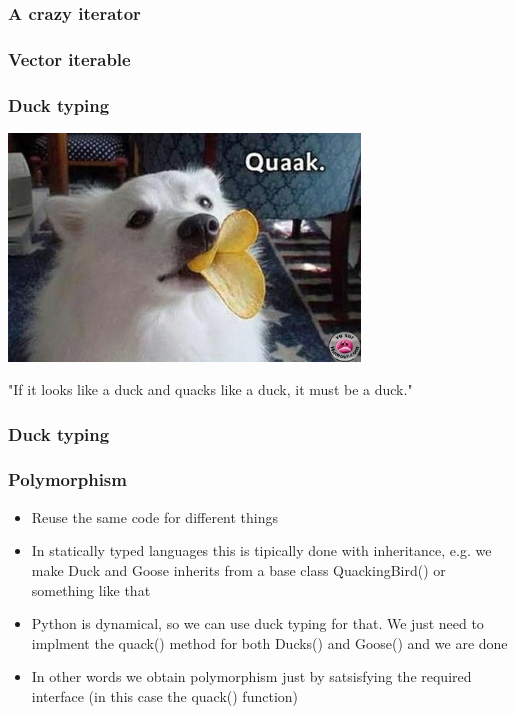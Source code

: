 \documentclass[9pt]{beamer}
\begin{document}
\begin{frame}
  \frametitle{A crazy iterator}
  
\end{frame}


\begin{frame}
  \frametitle{Vector iterable}
  
\end{frame}


\begin{frame}
  \frametitle{Duck typing}
  
  \centering
  \includegraphics[width=0.7\textwidth]{quack.png}  
  
  \bigskip
  
  \centering
  "If it looks like a duck and quacks like a duck, it must be a duck."
  
\end{frame}


\begin{frame}
  \frametitle{Duck typing}
  
\end{frame}


\begin{frame}
  \frametitle{Polymorphism}
  
  \begin{itemize}
    \item Reuse the same code for different things
    \medskip
    \item In statically typed languages this is tipically done with inheritance,
          e.g. we make Duck and Goose inherits from a base class QuackingBird()
          or something like that
    \medskip
    \item Python is dynamical, so we can use duck typing for that.
          We just need to implment the quack() method for both Ducks() and Goose() 
          and we are done
    \medskip
    \item In other words we obtain polymorphism just by satsisfying the required \alert{interface}
          (in this case the quack() function)
  \end{itemize}
  
\end{frame}
\end{document}
